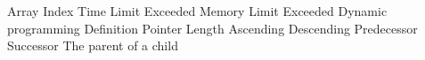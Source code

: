 %
%


 Array 
 Index
 Time Limit Exceeded
 Memory Limit Exceeded
 Dynamic programming 
 Definition
 Pointer 
 Length
 Ascending
 Descending
 Predecessor
 Successor
 The parent of a child
